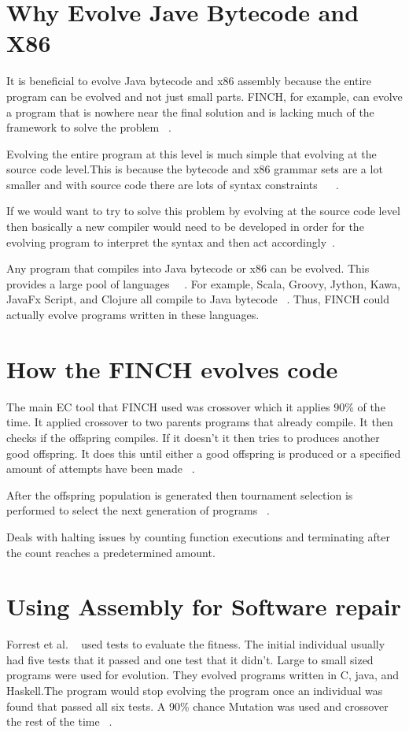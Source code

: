 \documentclass{sig-alternate}
\begin{document}
\section{Why Evolve Jave Bytecode and X86}
It is beneficial to evolve Java bytecode and x86 assembly because the entire program can be evolved and not just small parts. FINCH, for example, can evolve a program that is nowhere near the final solution and is lacking much of the framework to solve the problem ~\cite{FINCH:2010}. 

Evolving the entire program at this level is much simple that evolving at the source code level.This is because the bytecode and x86 grammar sets are a lot smaller and with source code there are lots of syntax constraints ~\cite{FINCH:2010} ~\cite{Assembly:2010}.

If we would want to try to solve this problem by evolving at the source code level then basically a new compiler would need to be developed in order for the evolving program to interpret the syntax and then act accordingly~\cite{FINCH:2010}.

Any program that compiles into Java bytecode or x86 can be evolved. This provides a large pool of languages~\cite{FINCH:2010} ~\cite{Assembly:2010}. For example, Scala, Groovy, Jython, Kawa, JavaFx Script, and Clojure all compile to Java bytecode ~\cite{FINCH:2010}. Thus, FINCH could actually evolve programs written in these languages.

\section{How the FINCH evolves code}
The main EC tool that FINCH used was crossover which it applies 90\% of the time. It applied crossover to two parents programs that already compile. It then checks if the offspring compiles. If it doesn't it then tries to produces another good offspring. It does this until either a good offspring is produced or a specified amount of attempts have been made ~\cite{FINCH:2010}.

After the offspring population is generated then tournament selection is performed to select the next generation of programs ~\cite{FINCH:2010}.

Deals with halting issues by counting function executions and terminating after the count reaches a predetermined amount.

\section{Using Assembly for Software repair}
Forrest et al. ~\cite{Assembly:2010} used tests to evaluate the fitness. The initial individual usually had five tests that it passed and one test that it didn't. Large to small sized programs were used for evolution. They evolved programs written in C, java, and Haskell.The program would stop evolving the program once an individual was found that passed all six tests. A 90\% chance Mutation was used and crossover the rest of the time ~\cite{Assembly:2010}.
\end{document}
